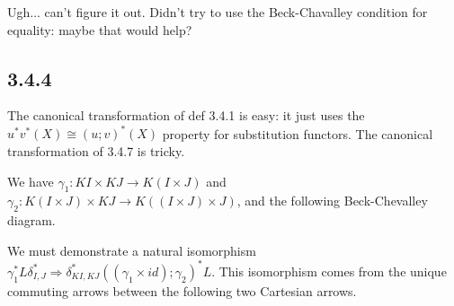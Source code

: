 \documentclass{article}
\begin{document}
Ugh... can't figure it out. Didn't try to use the Beck-Chavalley condition for equality: maybe that would help?

\subsection*{3.4.4}

The canonical transformation of def 3.4.1 is easy: it just uses the $u^*v^*(X) \cong (u;v)^*(X)$ property for 
substitution functors. The canonical transformation of 3.4.7 is tricky.

We have $\gamma_1 : KI \times KJ \to K(I \times J)$ and $\gamma_2 : K(I \times J) \times KJ \to K((I \times J) \times J)$, and the following Beck-Chevalley diagram.
\begin{center}
\end{center}
We must demonstrate a natural isomorphism $\gamma_1^*L\delta_{I,J}^* \Rightarrow \delta_{KI,KJ}^*((\gamma_1 \times id);\gamma_2)^*L$. This isomorphism comes from the unique 
commuting arrows between the following two Cartesian arrows.
\begin{center}
\end{center}
\end{document}
